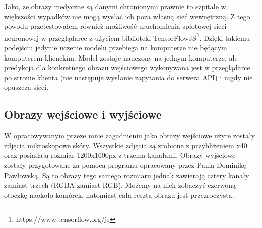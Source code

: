\documentclass{article}
\begin{document}
Jako, że obrazy medyczne są danymi chronionymi prawnie to szpitale w większości wypadków nie mogą wysłać ich poza własną sieć wewnętrzną.
Z tego powodu przetestowałem również możliwość uruchomienia splotowej sieci neuronowej w przeglądarce z użyciem biblioteki TensorFlowJS\footnote{https://www.tensorflow.org/js}.
Dzięki takiemu podejściu jedynie uczenie modelu przebiega na komputerze nie będącym komputerem klienckim.
Model zostaje nauczony na jednym komputerze, ale predykcja dla konkretnego obrazu wejściowego wykonywana jest w przeglądarce po stronie klienta (nie następuje wysłanie zapytania do serwera API) i nigdy nie opuszcza sieci.
\subsection{Obrazy wejściowe i wyjściowe}
W opracowywanym przeze mnie zagadnieniu jako obrazy wejściowe użyte zostały zdjęcia mikroskopowe skóry.
Wszystkie zdjęcia są zrobione z przybliżeniem x40 oraz posiadają rozmiar 1200x1600px z trzema kanałami.
Obrazy wyjściowe zostały przygotowane za pomocą programu opracowany przez Panią Dominikę Pawłowską.
Są to obrazy tego samego rozmiaru jednak zawierają cztery kanały zamiast trzech (RGBA zamiast RGB).
Możemy na nich zobaczyć czerwoną otoczkę naokoło komórek, natomiast cała reszta obrazu jest przezroczysta.
\end{document}
